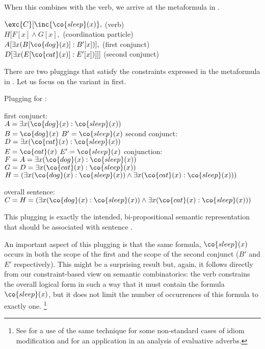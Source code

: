 \documentclass[output=paper]{langsci/langscibook}
\begin{document}
When this combines with the verb, we arrive at the metaformula in .\largerpage[2]

\ea \label{hund-katze-schlaf-lf}
$\exc{C} [\inc{\co{sleep}(x)},$ \hfill (verb)\\
$H[F[x] \land G[x],$ \hfill (coordination particle)\\
$A[\exists x (B[\co{dog}(x)]: B'[x])],$ \hfill (first conjunct)\\
$D[\exists x (E[\co{cat}(x)]: E'[x])]]]$ \hfill (second conjunct)
\z 

There are two pluggings that satisfy the constraints expressed in the metaformula in . Let us focus on the variant in  first.\largerpage[-2]\pagebreak

\ea \label{hund-katze-schlaf-plug}
Plugging for :
\begin{xlist}
\ex first conjunct:\label{hund-katze-schlaf-plug-conj1}\\
$A = \exists x (\co{dog}(x) : \co{sleep}(x))$\\
$B = \co{dog}(x)$ \qquad $B' = \co{sleep}(x)$
\ex second conjunct:\label{hund-katze-schlaf-plug-conj2}\\
$D = \exists x (\co{cat}(x) : \co{sleep}(x))$\\
$E = \co{cat}(x)$ \qquad $E' = \co{sleep}(x)$
\ex conjunction:\\
$F = A = \exists x (\co{dog}(x) : \co{sleep}(x))$\\
$G = D = \exists x (\co{cat}(x) : \co{sleep}(x))$\\
$H = (\exists x (\co{dog}(x) : \co{sleep}(x)) \land \exists x (\co{cat}(x) : \co{sleep}(x)))$
\item overall sentence:\\
$C = H = (\exists x (\co{dog}(x) : \co{sleep}(x)) \land \exists x (\co{cat}(x) : \co{sleep}(x)))$
\end{xlist}
\z

This plugging is exactly the intended, bi-propositional semantic representation that should be associated with sentence . 

An important aspect of this plugging is that the same formula, $\co{sleep}(x)$ occurs in both the scope of the first and the scope of the second conjunct ($B'$ and $E'$ respectively). This might be a surprising result but, again, it follows directly from our constraint-based view on semantic combinatorics: the verb constrains the overall logical form in such a way that it must contain the formula $\co{sleep}(x)$, but it does not limit the number of occurrences of this formula to exactly one.%
\footnote{See \citet{Sailer:05.hpsg} for a use of the same technique for some non-standard cases of idiom modification and \citet{Bonami:Godard:07} for an application in an analysis of evaluative adverbs.}
\end{document}
